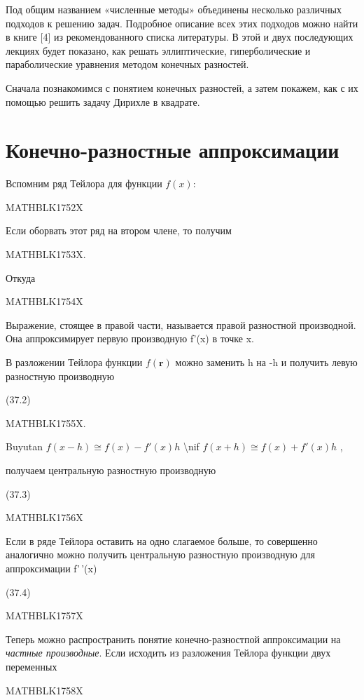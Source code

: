 \documentclass[
]{article}
\begin{document}
Под общим названием «численные методы» объединены несколько различных
подходов к решению задач. Подробное описание всех этих подходов можно
найти в книге {[}4{]} из рекомендованного списка литературы. В этой и
двух последующих лекциях будет показано, как решать эллиптические,
гиперболические и параболические уравнения методом конечных разностей.

Сначала познакомимся с понятием конечных разностей, а затем покажем, как
с их помощью решить задачу Дирихле в квадрате.

\section{Конечно-разностные
аппроксимации}\label{ux43aux43eux43dux435ux447ux43dux43e-ux440ux430ux437ux43dux43eux441ux442ux43dux44bux435-ux430ux43fux43fux440ux43eux43aux441ux438ux43cux430ux446ux438ux438}

Вспомним ряд Тейлора для функции \(f(x)\):

MATHBLK1752X

Если оборвать этот ряд на втором члене, то получим

MATHBLK1753X.

Откуда

MATHBLK1754X

Выражение, стоящее в правой части, называется правой разностной
производной. Она аппроксимирует первую производную f'(x) в точке x.

В разложении Тейлора функции \(f(\mathbf{r})\) можно заменить h на -h и
получить левую разностную производную

(37.2)

MATHBLK1755X.

Buyutan \(f(x - h) \cong f(x) - f'(x) h\) \textbackslash nif
\(f(x + h) \cong f( x) + f'(x) h\) ,

получаем центральную разностную производную

(37.3)

MATHBLK1756X

Если в ряде Тейлора оставить на одно слагаемое больше, то совершенно
аналогично можно получить центральную разностную производную для
аппроксимации f'\,'(x)

(37.4)

MATHBLK1757X

Теперь можно распространить понятие конечно-разностпой аппроксимации на
\emph{частные производные}. Если исходить из разложения Тейлора функции
двух переменных

MATHBLK1758X
\end{document}
